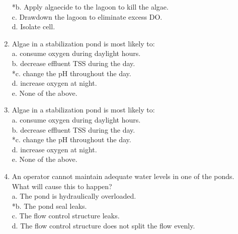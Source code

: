 \begin{enumerate}
*b. Apply algaecide to the lagoon to kill the algae. \\

c. Drawdown the lagoon to eliminate excess DO. \\

d. Isolate cell. \\


\item  Algae in a stabilization pond is most likely to: \\


a. consume oxygen during daylight hours. \\

b. decrease effluent TSS during the day. \\

*c. change the pH throughout the day. \\

d. increase oxygen at night. \\

e. None of the above. \\


\item  Algae in a stabilization pond is most likely to: \\


a. consume oxygen during daylight hours. \\

b. decrease effluent TSS during the day. \\

*c. change the pH throughout the day. \\

d. increase oxygen at night. \\

e. None of the above. \\


\item  An operator cannot maintain adequate water levels in one of the ponds. What will cause this to happen? \\


a. The pond is hydraulically overloaded. \\

*b. The pond seal leaks. \\

c. The flow control structure leaks. \\

d. The flow control structure does not split the flow evenly. \\



\end{enumerate}
